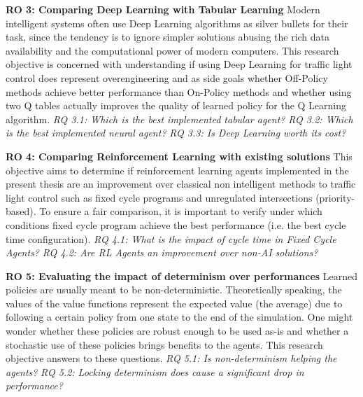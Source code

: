 \hfill \break
\noindent
\textbf{\hypertarget{ro3}{RO 3}: Comparing Deep Learning with Tabular Learning}
\hfill \break
Modern intelligent systems often use Deep Learning algorithms as silver bullets for their task, since the tendency is to ignore simpler solutions abusing the rich data availability and the computational power of modern computers.
This research objective is concerned with understanding if using Deep Learning for traffic light control does represent overengineering and as side goals whether Off-Policy methods achieve better performance than On-Policy methods and whether using two Q tables actually improves the quality of learned policy for the Q Learning algorithm.
\hfill \break
\textit{\hypertarget{rq3.1}{RQ 3.1}: Which is the best implemented tabular agent?}
\hfill \break
\textit{\hypertarget{rq3.2}{RQ 3.2}: Which is the best implemented neural agent?}
\hfill \break
\textit{\hypertarget{rq3.3}{RQ 3.3}: Is Deep Learning worth its cost?}

\hfill \break
\noindent
\textbf{\hypertarget{ro4}{RO 4}: Comparing Reinforcement Learning with existing solutions}
\hfill \break
This objective aims to determine if reinforcement learning agents implemented in the present thesis are an improvement over classical non intelligent methods to traffic light control such as fixed cycle programs and unregulated intersections (priority-based).
To ensure a fair comparison, it is important to verify under which conditions fixed cycle program achieve the best performance (i.e. the best cycle time configuration).
\hfill \break
\textit{\hypertarget{rq4.1}{RQ 4.1}: What is the impact of cycle time in Fixed Cycle Agents?}
\hfill \break
\textit{\hypertarget{rq4.2}{RQ 4.2}: Are RL Agents an improvement over non-AI solutions?}

\hfill \break
\noindent
\textbf{\hypertarget{ro5}{RO 5}: Evaluating the impact of determinism over performances}
\hfill \break
Learned policies are usually meant to be non-deterministic.
Theoretically speaking, the values of the value functions represent the expected value (the average) due to following a certain policy from one state to the end of the simulation.
One might wonder whether these policies are robust enough to be used as-is and whether a stochastic use of these policies brings benefits to the agents.
This research objective answers to these questions.
\hfill \break
\textit{\hypertarget{rq5.1}{RQ 5.1}: Is non-determinism helping the agents?}
\hfill \break
\textit{\hypertarget{rq5.2}{RQ 5.2}: Locking determinism does cause a significant drop in performance?}

